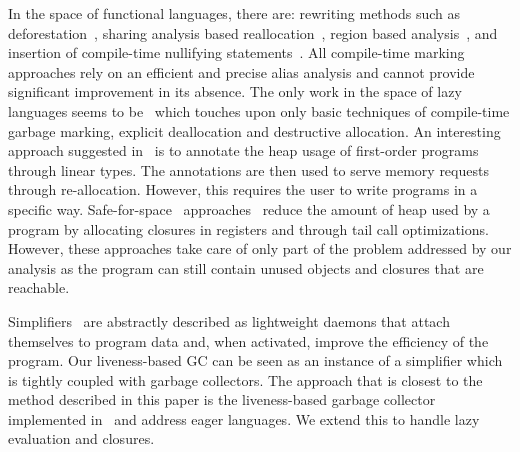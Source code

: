\documentclass[9pt,preprint,letter,nonatbib]{sigplanconf}
\begin{document}
In the space of functional languages, there are: rewriting methods
such as
deforestation~\cite{wadler88deforest,gill93ashort,chitil99deforest},
sharing analysis based reallocation~\cite{jones89compile}, region
based analysis~\cite{tofte98region}, and insertion of compile-time
nullifying statements~\cite{inoue88analysis, lee05static}.  All compile-time
marking approaches rely on an efficient and precise alias analysis and
cannot provide significant improvement in its absence. The only work
in the space of lazy languages seems to be~\cite{Hamilton}
which touches upon only basic techniques of compile-time garbage
marking, explicit deallocation and destructive allocation. An
interesting approach suggested in~\cite{HofmannJ03} is to annotate the
heap usage of first-order programs through linear types.  The
annotations are then used to serve memory requests through
re-allocation.  However, this requires the user to write programs in a
specific way.
%
Safe-for-space~\cite{appel.cps}              approaches~\cite{Clinger,
  shao00efficient}  reduce the  amount of  heap used  by a  program by
allocating   closures    in   registers   and   through    tail   call
optimizations. However, these approaches take care of only part of the
problem addressed  by our  analysis as the  program can  still contain
unused objects and closures that are reachable.
%

Simplifiers~\cite{ONeill}  are  abstractly  described  as  lightweight
daemons that  attach themselves to  program data and,  when activated,
improve the  efficiency of the  program. Our liveness-based GC  can be
seen as  an instance  of a  simplifier which  is tightly  coupled with
garbage  collectors.   The approach  that  is  closest to  the  method
described  in  this  paper  is the  liveness-based  garbage  collector
implemented  in~\cite{karkare07liveness,asati14lgc} and  address eager
languages. We extend this to handle lazy evaluation and closures.
 
\end{document}
